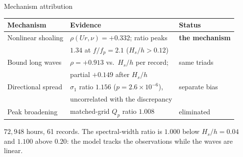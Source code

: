 \documentclass[10pt, aspectratio=169]{beamer}
\begin{document}
\begin{frame}{Mechanism attribution}
  \begin{table}
    \centering
    \small
    \begin{tabular}{@{}lll@{}}
      \toprule
      \textbf{Mechanism} & \textbf{Evidence} & \textbf{Status} \\
      \midrule
      Nonlinear shoaling &
        $\rho(\mathit{Ur},\nu) = +0.332$; ratio peaks &
        \textbf{the mechanism} \\
       &
        $1.34$ at $f/f_p = 2.1$ ($H_s/h > 0.12$) & \\
      \addlinespace
      Bound long waves &
        $\rho = +0.913$ vs.\ $H_s/h$ per record; &
        same triads \\
       &
        partial $+0.149$ after $H_s/h$ & \\
      \addlinespace
      Directional spread &
        $\sigma_1$ ratio $1.156$ ($p = 2.6\times10^{-6}$), &
        separate bias \\
       &
        uncorrelated with the discrepancy & \\
      \addlinespace
      Peak broadening &
        matched-grid $Q_p$ ratio $1.008$ &
        eliminated \\
      \bottomrule
    \end{tabular}
  \end{table}
  \vspace{0.5em}
  $72{,}948$ hours, 61 records. The spectral-width ratio is $1.000$ below
  $H_s/h = 0.04$ and $1.100$ above $0.20$: the model tracks the observations
  while the waves are linear.
\end{frame}
\end{document}
